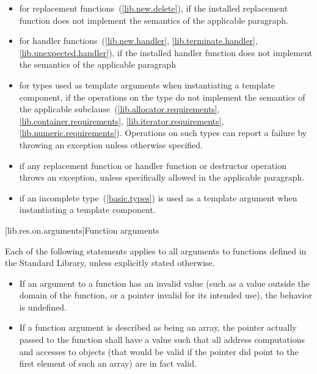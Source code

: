 \begin{itemize}
\item
for replacement functions~(\ref{lib.new.delete}), if the installed replacement function does not
implement the semantics of the applicable
\required
paragraph.
\item
for handler functions~(\ref{lib.new.handler}, \ref{lib.terminate.handler}, \ref{lib.unexpected.handler}),
if the installed handler function does not implement the semantics of the applicable
\required
paragraph
\item
for types used as template arguments when instantiating a template component,
if the operations on the type do not implement the semantics of the applicable
subclause~(\ref{lib.allocator.requirements}, \ref{lib.container.requirements}, \ref{lib.iterator.requirements},
\ref{lib.numeric.requirements}).
Operations on such types can report a failure by throwing an exception
unless otherwise specified.
\item
if any replacement function or handler function or destructor operation throws an exception,
unless specifically allowed
in the applicable
\required
paragraph.
\item
if an incomplete type~(\ref{basic.types}) is used as a template
argument when instantiating a template component.
\end{itemize}

[lib.res.on.arguments]{Function arguments}

\pnum
{}%
%
Each of the following statements applies to all arguments
%
to functions defined in the \Cpp Standard Library,%
unless explicitly stated otherwise.

\begin{itemize}
\item
If an argument to a function has an invalid value (such
%
as a value outside the domain of the function, or a pointer invalid for its
intended use), the behavior is undefined.
%

\item
If a function argument is described as being an array,
%
the pointer actually passed to the function shall have a value such that all
address computations and accesses to objects (that would be valid if the
pointer did point to the first element of such an array) are in fact valid.
\end{itemize}

